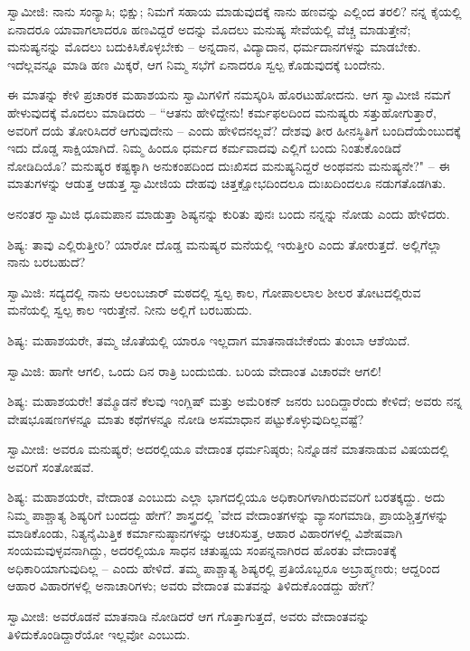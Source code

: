 ಸ್ವಾಮೀಜಿ: ನಾನು ಸಂನ್ಯಾಸಿ; ಭಿಕ್ಷು; ನಿಮಗೆ ಸಹಾಯ ಮಾಡುವುದಕ್ಕೆ ನಾನು ಹಣವನ್ನು ಎಲ್ಲಿಂದ ತರಲಿ? ನನ್ನ ಕೈಯಲ್ಲಿ ಏನಾದರೂ ಯಾವಾಗಲಾದರೂ ಹಣವಿದ್ದರೆ ಅದನ್ನು ಮೊದಲು ಮನುಷ್ಯ ಸೇವೆಯಲ್ಲಿ ವೆಚ್ಚ ಮಾಡುತ್ತೇನೆ; ಮನುಷ್ಯನನ್ನು ಮೊದಲು ಬದುಕಿಸಿಕೊಳ್ಳಬೇಕು – ಅನ್ನದಾನ, ವಿದ್ಯಾದಾನ, ಧರ್ಮದಾನಗಳನ್ನು ಮಾಡಬೇಕು. ಇದೆಲ್ಲವನ್ನೂ ಮಾಡಿ ಹಣ ಮಿಕ್ಕರೆ, ಆಗ ನಿಮ್ಮ ಸಭೆಗೆ ಏನಾದರೂ ಸ್ವಲ್ಪ ಕೊಡುವುದಕ್ಕೆ ಬಂದೇನು.

ಈ ಮಾತನ್ನು ಕೇಳಿ ಪ್ರಚಾರಕ ಮಹಾಶಯನು ಸ್ವಾಮಿಗಳಿಗೆ ನಮಸ್ಕರಿಸಿ ಹೊರಟುಹೋದನು. ಆಗ ಸ್ವಾಮೀಜಿ ನಮಗೆ ಹೇಳುವುದಕ್ಕೆ ಮೊದಲು ಮಾಡಿದರು – “ಆತನು ಹೇಳಿದ್ದೇನು! ಕರ್ಮಫಲದಿಂದ ಮನುಷ್ಯರು ಸತ್ತುಹೋಗುತ್ತಾರೆ, ಅವರಿಗೆ ದಯೆ ತೋರಿಸಿದರೆ ಆಗುವುದೇನು – ಎಂದು ಹೇಳಿದನಲ್ಲವೆ? ದೇಶವು ತೀರ ಹೀನಸ್ಥಿತಿಗೆ ಬಂದಿದೆಯೆಂಬುದಕ್ಕೆ ಇದು ದೊಡ್ಡ ಸಾಕ್ಷಿಯಾಗಿದೆ. ನಿಮ್ಮ ಹಿಂದೂ ಧರ್ಮದ ಕರ್ಮವಾದವು ಎಲ್ಲಿಗೆ ಬಂದು ನಿಂತುಕೊಂಡಿದೆ ನೋಡಿದಿಯೊ? ಮನುಷ್ಯರ ಕಷ್ಟಕ್ಕಾಗಿ ಅನುಕಂಪದಿಂದ ದುಃಖಿಸದ ಮನುಷ್ಯನಿದ್ದರೆ ಅಂಥವನು ಮನುಷ್ಯನೇ?" – ಈ ಮಾತುಗಳನ್ನು ಆಡುತ್ತ ಆಡುತ್ತ ಸ್ವಾಮೀಜಿಯ ದೇಹವು ಚಿತ್ತಕ್ಷೋಭದಿಂದಲೂ ದುಃಖದಿಂದಲೂ ನಡುಗತೊಡಗಿತು.

ಅನಂತರ ಸ್ವಾಮಿಜಿ ಧೂಮಪಾನ ಮಾಡುತ್ತಾ ಶಿಷ್ಯನನ್ನು ಕುರಿತು ಪುನಃ ಬಂದು ನನ್ನನ್ನು ನೋಡು ಎಂದು ಹೇಳಿದರು.

\newpage

ಶಿಷ್ಯ: ತಾವು ಎಲ್ಲಿರುತ್ತೀರಿ? ಯಾರೋ ದೊಡ್ಡ ಮನುಷ್ಯರ ಮನೆಯಲ್ಲಿ ಇರುತ್ತೀರಿ ಎಂದು ತೋರುತ್ತದೆ. ಅಲ್ಲಿಗೆಲ್ಲಾ ನಾನು ಬರಬಹುದೆ?

ಸ್ವಾಮಿಜಿ: ಸದ್ಯದಲ್ಲಿ ನಾನು ಆಲಂಬಜಾರ್‌ ಮಠದಲ್ಲಿ ಸ್ವಲ್ಪ ಕಾಲ, ಗೋಪಾಲಲಾಲ ಶೀಲರ ತೋಟದಲ್ಲಿರುವ ಮನೆಯಲ್ಲಿ ಸ್ವಲ್ಪ ಕಾಲ ಇರುತ್ತೇನೆ. ನೀನು ಅಲ್ಲಿಗೆ ಬರಬಹುದು.

ಶಿಷ್ಯ: ಮಹಾಶಯರೇ, ತಮ್ಮ ಜೊತೆಯಲ್ಲಿ ಯಾರೂ ಇಲ್ಲದಾಗ ಮಾತನಾಡಬೇಕೆಂದು ತುಂಬಾ ಆಶೆಯಿದೆ.

ಸ್ವಾಮಿಜಿ: ಹಾಗೇ ಆಗಲಿ, ಒಂದು ದಿನ ರಾತ್ರಿ ಬಂದುಬಿಡು. ಬರಿಯ ವೇದಾಂತ ವಿಚಾರವೇ ಆಗಲಿ!

ಶಿಷ್ಯ: ಮಹಾಶಯರೇ! ತಮ್ಮೊಡನೆ ಕೆಲವು ಇಂಗ್ಲಿಷ್ ಮತ್ತು ಅಮೆರಿಕನ್ ಜನರು ಬಂದಿದ್ದಾರೆಂದು ಕೇಳಿದೆ; ಅವರು ನನ್ನ ವೇಷಭೂಷಣಗಳನ್ನೂ ಮಾತು ಕಥೆಗಳನ್ನೂ ನೋಡಿ ಅಸಮಾಧಾನ ಪಟ್ಟುಕೊಳ್ಳುವುದಿಲ್ಲವಷ್ಟೆ?

ಸ್ವಾಮೀಜಿ: ಅವರೂ ಮನುಷ್ಯರೆ; ಅದರಲ್ಲಿಯೂ ವೇದಾಂತ ಧರ್ಮನಿಷ್ಠರು; ನಿನ್ನೊಡನೆ ಮಾತನಾಡುವ ವಿಷಯದಲ್ಲಿ ಅವರಿಗೆ ಸಂತೋಷವೆ.

ಶಿಷ್ಯ: ಮಹಾಶಯರೇ, ವೇದಾಂತ ಎಂಬುದು ಎಲ್ಲಾ ಭಾಗದಲ್ಲಿಯೂ ಅಧಿಕಾರಿಗಳಾಗಿರುವವರಿಗೆ ಬರತಕ್ಕದ್ದು. ಅದು ನಿಮ್ಮ ಪಾಶ್ಚಾತ್ಯ ಶಿಷ್ಯರಿಗೆ ಬಂದದ್ದು ಹೇಗೆ? ಶಾಸ್ತ್ರದಲ್ಲಿ 'ವೇದ ವೇದಾಂತಗಳನ್ನು ವ್ಯಾಸಂಗಮಾಡಿ, ಪ್ರಾಯಶ್ಚಿತ್ತಗಳನ್ನು ಮಾಡಿಕೊಂಡು, ನಿತ್ಯನೈಮಿತ್ತಿಕ ಕರ್ಮಾನುಷ್ಠಾನಗಳನ್ನು ಆಚರಿಸುತ್ತ, ಆಹಾರ ವಿಹಾರಗಳಲ್ಲಿ ವಿಶೇಷವಾಗಿ ಸಂಯಮವುಳ್ಳವನಾಗಿದ್ದು, ಅದರಲ್ಲಿಯೂ ಸಾಧನ ಚತುಷ್ಟಯ ಸಂಪನ್ನನಾಗಿರದ ಹೊರತು ವೇದಾಂತಕ್ಕೆ ಅಧಿಕಾರಿಯಾಗುವುದಿಲ್ಲ – ಎಂದು ಹೇಳಿದೆ. ತಮ್ಮ ಪಾಶ್ಚಾತ್ಯ ಶಿಷ್ಯರಲ್ಲಿ ಪ್ರತಿಯೊಬ್ಬರೂ ಅಬ್ರಾಹ್ಮಣರು; ಆದ್ದರಿಂದ ಆಹಾರ ವಿಹಾರಗಳಲ್ಲಿ ಅನಾಚಾರಿಗಳು; ಅವರು ವೇದಾಂತ ಮತವನ್ನು ತಿಳಿದುಕೊಂಡದ್ದು ಹೇಗೆ?

ಸ್ವಾಮೀಜಿ: ಅವರೊಡನೆ ಮಾತನಾಡಿ ನೋಡಿದರೆ ಆಗ ಗೊತ್ತಾಗುತ್ತದೆ, ಅವರು ವೇದಾಂತವನ್ನು ತಿಳಿದುಕೊಂಡಿದ್ದಾರೆಯೋ ಇಲ್ಲವೋ ಎಂಬುದು.

